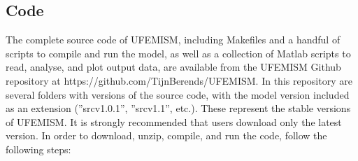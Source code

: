 \documentclass{article}
\begin{document}
\subsection{Code}

The complete source code of UFEMISM, including Makefiles and a handful of scripts to compile and run the model, as well as a collection of Matlab scripts to read, analyse, and plot output data, are available from the UFEMISM Github repository at https://github.com/TijnBerends/UFEMISM. In this repository are several folders with versions of the source code, with the model version included as an extension (''src\textunderscore v1.0.1'', ''src\textunderscore v1.1'', etc.). These represent the stable versions of UFEMISM. It is strongly recommended that users download only the latest version. In order to download, unzip, compile, and run the code, follow the following steps:
\end{document}
